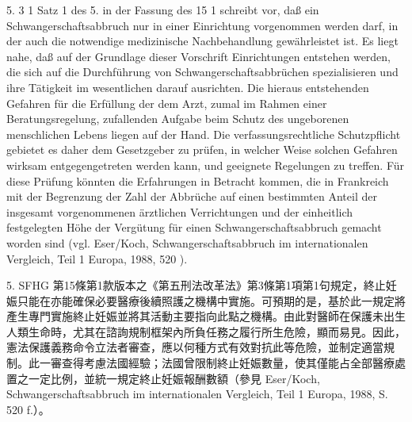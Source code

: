 \documentclass[12pt]{article}
\begin{document}
\begin{sourcepara}[title={原文D.148}]
5. \abbrArt{} 3 \abbrAbs{} 1 Satz 1 des 5. \abbrStrRG{} in der Fassung des \abbrArt{} 15 \abbrNr{} 1 \abbrSFHG{} schreibt vor, daß ein Schwangerschaftsabbruch nur in einer Einrichtung vorgenommen werden darf, in der auch die notwendige medizinische Nachbehandlung gewährleistet ist. Es liegt nahe, daß auf der Grundlage dieser Vorschrift Einrichtungen entstehen werden, die sich auf die Durchführung von Schwangerschaftsabbrüchen spezialisieren und ihre Tätigkeit im wesentlichen darauf ausrichten. Die hieraus entstehenden Gefahren für die Erfüllung der dem Arzt, zumal im Rahmen einer Beratungsregelung, zufallenden Aufgabe beim Schutz des ungeborenen menschlichen Lebens liegen auf der Hand. Die verfassungsrechtliche Schutzpflicht gebietet es daher dem Gesetzgeber zu prüfen, in welcher Weise solchen Gefahren wirksam entgegengetreten werden kann, und geeignete Regelungen zu treffen. Für diese Prüfung könnten die Erfahrungen in Betracht kommen, die in Frankreich mit der Begrenzung der Zahl der Abbrüche auf einen bestimmten Anteil der insgesamt vorgenommenen ärztlichen Verrichtungen und der einheitlich festgelegten Höhe der Vergütung für einen Schwangerschaftsabbruch gemacht worden sind (vgl. Eser/Koch, Schwangerschaftsabbruch im internationalen Vergleich, Teil 1 Europa, 1988, \abbrS{} 520 \abbrF{}).
\end{sourcepara}
\begin{transpara}
5. SFHG 第15條第1款版本之《第五刑法改革法》第3條第1項第1句規定，終止妊娠只能在亦能確保必要醫療後續照護之機構中實施。可預期的是，基於此一規定將產生專門實施終止妊娠並將其活動主要指向此點之機構。由此對醫師在保護未出生人類生命時，尤其在諮詢規制框架內所負任務之履行所生危險，顯而易見。因此，憲法保護義務命令立法者審查，應以何種方式有效對抗此等危險，並制定適當規制。此一審查得考慮法國經驗；法國曾限制終止妊娠數量，使其僅能占全部醫療處置之一定比例，並統一規定終止妊娠報酬數額（參見 Eser/Koch, Schwangerschaftsabbruch im internationalen Vergleich, Teil 1 Europa, 1988, S. 520 f.）。
\end{transpara}
\end{document}

